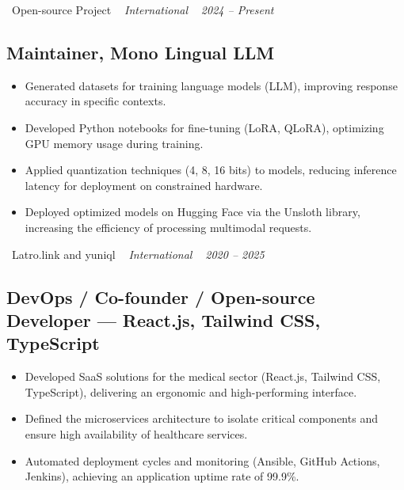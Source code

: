 \documentclass[10pt,a4paper]{article}
\begin{document}
\vspace{10pt}

\noindent\textcolor{primary}{ \faBuilding\ Open-source Project} \quad
\textit{ \small \textcolor{darkgray}{ \faMapMarker\ } International } \hfill
\textit{ \small \textcolor{darkgray}{ \faCalendar\ } 2024 -- Present }

\vspace{4pt}

\subsection*{Maintainer, Mono Lingual LLM}
\color{darkgray}
\begin{itemize}
  \item Generated datasets for training language models (LLM), improving response accuracy in specific contexts.
  \item Developed Python notebooks for fine-tuning (LoRA, QLoRA), optimizing GPU memory usage during training.
  \item Applied quantization techniques (4, 8, 16 bits) to models, reducing inference latency for deployment on constrained hardware.
  \item Deployed optimized models on Hugging Face via the Unsloth library, increasing the efficiency of processing multimodal requests.
\end{itemize}

\vspace{10pt}

\noindent\textcolor{primary}{ \faBuilding\ Latro.link and yuniql} \quad
\textit{ \small \textcolor{darkgray}{ \faMapMarker\ } International } \hfill
\textit{ \small \textcolor{darkgray}{ \faCalendar\ } 2020 -- 2025 }

\vspace{4pt}

\subsection*{DevOps / Co-founder / Open-source Developer --- React.js, Tailwind CSS, TypeScript}
\color{darkgray}
\begin{itemize}
  \item Developed SaaS solutions for the medical sector (React.js, Tailwind CSS, TypeScript), delivering an ergonomic and high-performing interface.
  \item Defined the microservices architecture to isolate critical components and ensure high availability of healthcare services.
  \item Automated deployment cycles and monitoring (Ansible, GitHub Actions, Jenkins), achieving an application uptime rate of 99.9\%.
\end{itemize}
\end{document}
